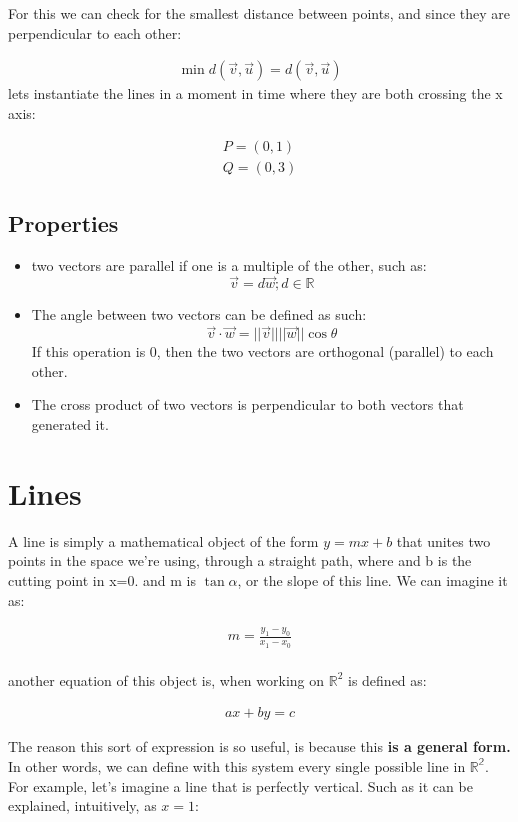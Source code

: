 \documentclass[11pt,fleqn]{book} %
\begin{document}
For this we can check for the smallest distance between points, and since they are perpendicular to each other:

\begin{gather}
    \min d (\vec{v}, \vec{u}) = d(\vec{v}, \vec{u})
\end{gather}
lets instantiate the lines in a moment in time where they are both crossing the x axis:

\begin{gather}
    P = (0,1) \\
    Q = (0,3)
\end{gather}


\subsection{Properties}
\begin{itemize}
    \item two vectors are parallel if one is a multiple of the other, such as:
    $$\vec{v} = d\vec{w} ; d \in \mathbb{R}$$
    \item The angle between two vectors can be defined as such:
    $$\vec{v}\cdot\vec{w}=||\vec{v}|| ||\vec{w}|| \cos{\theta}$$
    If this operation is 0, then the two vectors are orthogonal (parallel) to each other.
    \item The cross product of two vectors is perpendicular to both vectors that generated it.
\end{itemize}

\section{Lines}

A line is simply a mathematical object of the form $ y = mx + b $ that unites two points in the space we're using, through a straight path, where and b is the cutting point in x=0.
and m is $\tan{\alpha}$, or the slope of this line. We can imagine it as:

\begin{gather}
    m = \frac{y_1 - y_0}{x_1 - x_0} \\
\end{gather}

another equation of this object is, when working on $\mathbb{R}^2$
is defined as:

\begin{gather}
    ax + by = c
\end{gather}

The reason this sort of expression is so useful, is because this \textbf{is a general form.} In other words, we can define with this system every single possible line in $\mathbb{R^2}$.
For example, let's imagine a line that is perfectly vertical. Such as it can be explained, intuitively, as $x = 1$:
\end{document}
